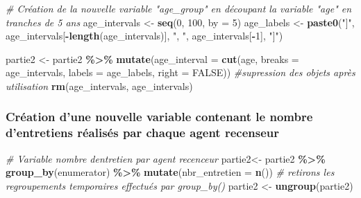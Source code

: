 \documentclass[
]{article}
\newenvironment{Shaded}{\begin{snugshade}}{\end{snugshade}}
\newcommand{\AttributeTok}[1]{\textcolor[rgb]{0.13,0.29,0.53}{#1}}
\newcommand{\CommentTok}[1]{\textcolor[rgb]{0.56,0.35,0.01}{\textit{#1}}}
\newcommand{\ConstantTok}[1]{\textcolor[rgb]{0.56,0.35,0.01}{#1}}
\newcommand{\DecValTok}[1]{\textcolor[rgb]{0.00,0.00,0.81}{#1}}
\newcommand{\FunctionTok}[1]{\textcolor[rgb]{0.13,0.29,0.53}{\textbf{#1}}}
\newcommand{\NormalTok}[1]{#1}
\newcommand{\OtherTok}[1]{\textcolor[rgb]{0.56,0.35,0.01}{#1}}
\newcommand{\SpecialCharTok}[1]{\textcolor[rgb]{0.81,0.36,0.00}{\textbf{#1}}}
\newcommand{\StringTok}[1]{\textcolor[rgb]{0.31,0.60,0.02}{#1}}
\begin{document}
\begin{Shaded}
\begin{Highlighting}[]
\CommentTok{\# Création de la nouvelle variable "age\_group" en découpant la variable "age" en tranches de 5 ans}
\NormalTok{age\_intervals }\OtherTok{\textless{}{-}} \FunctionTok{seq}\NormalTok{(}\DecValTok{0}\NormalTok{, }\DecValTok{100}\NormalTok{, }\AttributeTok{by =} \DecValTok{5}\NormalTok{)}
\NormalTok{age\_labels }\OtherTok{\textless{}{-}} \FunctionTok{paste0}\NormalTok{(}\StringTok{"]"}\NormalTok{, age\_intervals[}\SpecialCharTok{{-}}\FunctionTok{length}\NormalTok{(age\_intervals)], }\StringTok{", "}\NormalTok{, age\_intervals[}\SpecialCharTok{{-}}\DecValTok{1}\NormalTok{], }\StringTok{"]"}\NormalTok{)}

\NormalTok{partie2 }\OtherTok{\textless{}{-}}\NormalTok{ partie2 }\SpecialCharTok{\%\textgreater{}\%}
  \FunctionTok{mutate}\NormalTok{(}\AttributeTok{age\_interval =} \FunctionTok{cut}\NormalTok{(age, }\AttributeTok{breaks =}\NormalTok{ age\_intervals, }\AttributeTok{labels =}\NormalTok{ age\_labels, }\AttributeTok{right =} \ConstantTok{FALSE}\NormalTok{))}
\CommentTok{\#supression des objets après utilisation}
\FunctionTok{rm}\NormalTok{(age\_intervals, age\_intervals)}
\end{Highlighting}
\end{Shaded}

\hypertarget{cruxe9ation-dune-nouvelle-variable-contenant-le-nombre-dentretiens-ruxe9alisuxe9s-par-chaque-agent-recenseur}{%
\subsubsection{Création d'une nouvelle variable contenant le nombre
d'entretiens réalisés par chaque agent
recenseur}\label{cruxe9ation-dune-nouvelle-variable-contenant-le-nombre-dentretiens-ruxe9alisuxe9s-par-chaque-agent-recenseur}}

\begin{Shaded}
\begin{Highlighting}[]
\CommentTok{\# Variable nombre d\textquotesingle{}entretien par agent recenceur}
\NormalTok{partie2}\OtherTok{\textless{}{-}}\NormalTok{ partie2 }\SpecialCharTok{\%\textgreater{}\%} \FunctionTok{group\_by}\NormalTok{(enumerator) }\SpecialCharTok{\%\textgreater{}\%} \FunctionTok{mutate}\NormalTok{(}\AttributeTok{nbr\_entretien =} \FunctionTok{n}\NormalTok{())}
\CommentTok{\#  retirons les regroupements temporaires effectués par group\_by()}
\NormalTok{partie2 }\OtherTok{\textless{}{-}} \FunctionTok{ungroup}\NormalTok{(partie2)}
\end{Highlighting}
\end{Shaded}
\end{document}
